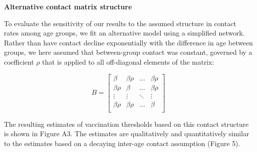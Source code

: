 \textbf{Alternative contact matrix structure}

To evaluate the sensitivity of our results to the assumed structure in contact rates among age groups, we fit an alternative model using a simplified network. Rather than have contact decline exponentially with the difference in age between groups, we here assumed that between-group contact was constant, governed by a coefficient $\rho$ that is applied to all off-diagonal elements of the matrix:

\begin{equation}
B = \left[{
\begin{array}{cccc}
  {\beta} & {\beta \rho} & \ldots &  {\beta \rho}  \\
  {\beta \rho} & {\beta} & \ldots &  {\beta \rho} \\
  \vdots & \vdots & \ddots  & \vdots \\
  {\beta \rho} & {\beta \rho} & \ldots & {\beta}  \\
\end{array}
}\right]
\end{equation}

The resulting estimates of vaccination thresholds based on this contact structure is shown in Figure A3. The estimates are qualitatively and quantitatively similar to the estimates based on a decaying inter-age contact assumption (Figure 5).